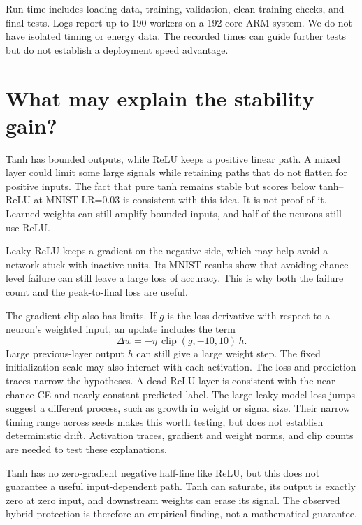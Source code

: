 \documentclass[10pt]{article}
\begin{document}
Run time includes loading data, training, validation, clean training checks, and final tests. Logs report up to 190 workers on a 192-core ARM system. We do not have isolated timing or energy data. The recorded times can guide further tests but do not establish a deployment speed advantage.

\FloatBarrier
\section{What may explain the stability gain?}
Tanh has bounded outputs, while ReLU keeps a positive linear path. A mixed layer could limit some large signals while retaining paths that do not flatten for positive inputs. The fact that pure tanh remains stable but scores below tanh--ReLU at MNIST LR=0.03 is consistent with this idea. It is not proof of it. Learned weights can still amplify bounded inputs, and half of the neurons still use ReLU.

Leaky-ReLU keeps a gradient on the negative side, which may help avoid a network stuck with inactive units. Its MNIST results show that avoiding chance-level failure can still leave a large loss of accuracy. This is why both the failure count and the peak-to-final loss are useful.

The gradient clip also has limits. If $g$ is the loss derivative with respect to a neuron's weighted input, an update includes the term
\begin{equation}\Delta w=-\eta\,\operatorname{clip}(g,-10,10)\,h.\end{equation}
Large previous-layer output $h$ can still give a large weight step. The fixed initialization scale may also interact with each activation. The loss and prediction traces narrow the hypotheses. A dead ReLU layer is consistent with the near-chance CE and nearly constant predicted label. The large leaky-model loss jumps suggest a different process, such as growth in weight or signal size. Their narrow timing range across seeds makes this worth testing, but does not establish deterministic drift. Activation traces, gradient and weight norms, and clip counts are needed to test these explanations.

Tanh has no zero-gradient negative half-line like ReLU, but this does not guarantee a useful input-dependent path. Tanh can saturate, its output is exactly zero at zero input, and downstream weights can erase its signal. The observed hybrid protection is therefore an empirical finding, not a mathematical guarantee.
\end{document}

